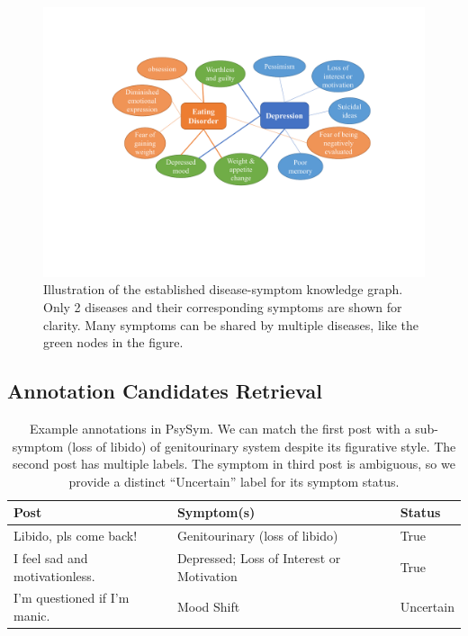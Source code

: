 \begin{figure}[ht]
    \centering
    \includegraphics[width=1.0\columnwidth]{figures/symp_kg_v2.pdf}
    \caption{Illustration of the established disease-symptom knowledge graph. Only 2 diseases and their corresponding symptoms are shown for clarity. Many symptoms can be shared by multiple diseases, like the green nodes in the figure.}
    \label{fig:symp_kg}
\end{figure}

\subsection{Annotation Candidates Retrieval}
\label{sec:data_retrieval}

\begin{table}[t]
    \small
    \centering
    \begin{tabular}{|l|l|l|}
    \hline
        Post & Symptom(s) & Status  \\ \hline
        Libido, pls come back! & Genitourinary (loss of libido) & True  \\ \hline
        I feel sad and motivationless. & Depressed; Loss of Interest or Motivation & True  \\ \hline
        I'm questioned if I'm manic. & Mood Shift & Uncertain  \\ \hline
    \end{tabular}
    \caption{Example annotations in PsySym. We can match the first post with a sub-symptom (loss of libido) of genitourinary system despite its figurative style. The second post has multiple labels. The symptom in third post is ambiguous, so we provide a distinct ``Uncertain'' label for its symptom status.}
    \label{tab:label_example}
\end{table}

